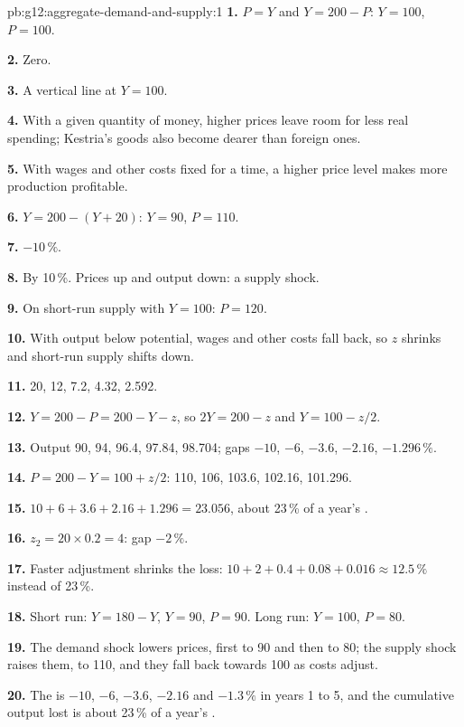 \begin{solution}{pb:g12:aggregate-demand-and-supply:1}
\textbf{1.} $P = Y$ and $Y = 200 - P$: $Y = 100$, $P = 100$.

\textbf{2.} Zero.

\textbf{3.} A vertical line at $Y = 100$.

\textbf{4.} With a given quantity of money, higher prices leave room for less real spending; Kestria's goods also become dearer than foreign ones.

\textbf{5.} With wages and other costs fixed for a time, a higher price level makes more production profitable.

\textbf{6.} $Y = 200 - (Y + 20)$: $Y = 90$, $P = 110$.

\textbf{7.} $-10\,\%$.

\textbf{8.} By 10\,\%. Prices up and output down: a supply shock.

\textbf{9.} On short-run supply with $Y = 100$: $P = 120$.

\textbf{10.} With output below potential, wages and other costs fall back, so $z$ shrinks and short-run supply shifts down.

\textbf{11.} 20, 12, 7.2, 4.32, 2.592.

\textbf{12.} $Y = 200 - P = 200 - Y - z$, so $2Y = 200 - z$ and $Y = 100 - z/2$.

\textbf{13.} Output 90, 94, 96.4, 97.84, 98.704; gaps $-10$, $-6$, $-3.6$, $-2.16$, $-1.296\,\%$.

\textbf{14.} $P = 200 - Y = 100 + z/2$: 110, 106, 103.6, 102.16, 101.296.

\textbf{15.} $10 + 6 + 3.6 + 2.16 + 1.296 = 23.056$, about 23\,\% of a year's .

\textbf{16.} $z_2 = 20 \times 0.2 = 4$: gap $-2\,\%$.

\textbf{17.} Faster adjustment shrinks the loss: $10 + 2 + 0.4 + 0.08 + 0.016 \approx 12.5\,\%$ instead of 23\,\%.

\textbf{18.} Short run: $Y = 180 - Y$, $Y = 90$, $P = 90$. Long run: $Y = 100$, $P = 80$.

\textbf{19.} The demand shock lowers prices, first to 90 and then to 80; the supply shock raises them, to 110, and they fall back towards 100 as costs adjust.

\textbf{20.} The  is $-10$, $-6$, $-3.6$, $-2.16$ and $-1.3\,\%$ in years 1 to 5, and the cumulative output lost is about 23\,\% of a year's .
\end{solution}
